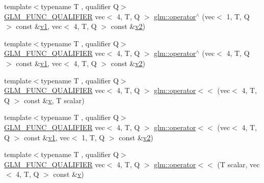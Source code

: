 \begin{DoxyCompactItemize}
\item 
{\footnotesize template$<$typename T , qualifier Q$>$ }\\\mbox{\hyperlink{setup_8hpp_a33fdea6f91c5f834105f7415e2a64407}{G\+L\+M\+\_\+\+F\+U\+N\+C\+\_\+\+Q\+U\+A\+L\+I\+F\+I\+ER}} vec$<$ 4, T, Q $>$ \mbox{\hyperlink{namespaceglm_a4aaa0bd6bba3f951e9bfe5b1e5cee9de}{glm\+::operator$^\wedge$}} (vec$<$ 1, T, Q $>$ const \&\mbox{\hyperlink{_s_d_l__opengl__glext_8h_a435c176a02c061b43e19bdf7c86cceae}{v1}}, vec$<$ 4, T, Q $>$ const \&\mbox{\hyperlink{_s_d_l__opengl__glext_8h_a0928f6d0f0f794ba000a21dfae422136}{v2}})
\item 
{\footnotesize template$<$typename T , qualifier Q$>$ }\\\mbox{\hyperlink{setup_8hpp_a33fdea6f91c5f834105f7415e2a64407}{G\+L\+M\+\_\+\+F\+U\+N\+C\+\_\+\+Q\+U\+A\+L\+I\+F\+I\+ER}} vec$<$ 4, T, Q $>$ \mbox{\hyperlink{namespaceglm_a9a55b3ffed7e929e9025c5e5ec921b78}{glm\+::operator$^\wedge$}} (vec$<$ 4, T, Q $>$ const \&\mbox{\hyperlink{_s_d_l__opengl__glext_8h_a435c176a02c061b43e19bdf7c86cceae}{v1}}, vec$<$ 4, T, Q $>$ const \&\mbox{\hyperlink{_s_d_l__opengl__glext_8h_a0928f6d0f0f794ba000a21dfae422136}{v2}})
\item 
{\footnotesize template$<$typename T , qualifier Q$>$ }\\\mbox{\hyperlink{setup_8hpp_a33fdea6f91c5f834105f7415e2a64407}{G\+L\+M\+\_\+\+F\+U\+N\+C\+\_\+\+Q\+U\+A\+L\+I\+F\+I\+ER}} vec$<$ 4, T, Q $>$ \mbox{\hyperlink{namespaceglm_a3d916d006a5c38709f1ad232cec3dcba}{glm\+::operator$<$$<$}} (vec$<$ 4, T, Q $>$ const \&\mbox{\hyperlink{_s_d_l__opengl_8h_a10a82eabcb59d2fcd74acee063775f90}{v}}, T scalar)
\item 
{\footnotesize template$<$typename T , qualifier Q$>$ }\\\mbox{\hyperlink{setup_8hpp_a33fdea6f91c5f834105f7415e2a64407}{G\+L\+M\+\_\+\+F\+U\+N\+C\+\_\+\+Q\+U\+A\+L\+I\+F\+I\+ER}} vec$<$ 4, T, Q $>$ \mbox{\hyperlink{namespaceglm_abfec4bd0d957f7f88b462f25b2e29c01}{glm\+::operator$<$$<$}} (vec$<$ 4, T, Q $>$ const \&\mbox{\hyperlink{_s_d_l__opengl__glext_8h_a435c176a02c061b43e19bdf7c86cceae}{v1}}, vec$<$ 1, T, Q $>$ const \&\mbox{\hyperlink{_s_d_l__opengl__glext_8h_a0928f6d0f0f794ba000a21dfae422136}{v2}})
\item 
{\footnotesize template$<$typename T , qualifier Q$>$ }\\\mbox{\hyperlink{setup_8hpp_a33fdea6f91c5f834105f7415e2a64407}{G\+L\+M\+\_\+\+F\+U\+N\+C\+\_\+\+Q\+U\+A\+L\+I\+F\+I\+ER}} vec$<$ 4, T, Q $>$ \mbox{\hyperlink{namespaceglm_afb7ab0d705b687ee03bd04e980a02df5}{glm\+::operator$<$$<$}} (T scalar, vec$<$ 4, T, Q $>$ const \&\mbox{\hyperlink{_s_d_l__opengl_8h_a10a82eabcb59d2fcd74acee063775f90}{v}})

\end{DoxyCompactItemize}
